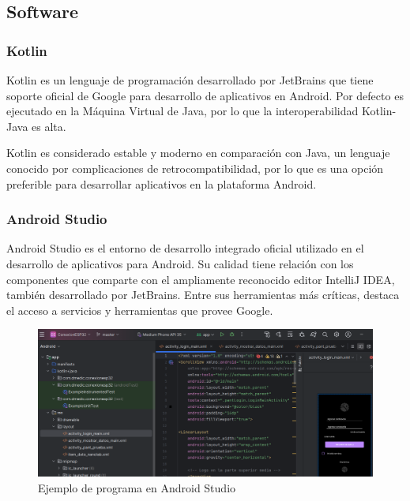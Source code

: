 \documentclass[../main]{subfiles}
\begin{document}
\subsection{Software}

\subsubsection{Kotlin}

Kotlin es un lenguaje de programación desarrollado por JetBrains que tiene
soporte oficial de Google para desarrollo de aplicativos en Android.
Por defecto es ejecutado en la Máquina Virtual de Java, por lo que la
interoperabilidad Kotlin-Java es alta. \supercite{JetBrains}

Kotlin es considerado estable y moderno en comparación con Java, un lenguaje
conocido por complicaciones de retrocompatibilidad, por lo que es una opción
preferible para desarrollar aplicativos en la plataforma Android.
\supercite{Moskala_Wojda_2017b}

\subsubsection{Android Studio}

Android Studio es el entorno de desarrollo integrado oficial utilizado en el
desarrollo de aplicativos para Android.
Su calidad tiene relación con los componentes que comparte con el ampliamente
reconocido editor IntelliJ IDEA, también desarrollado por JetBrains.
Entre sus herramientas más críticas, destaca el acceso a servicios y
herramientas que provee Google. \supercite{android_developers}

\begin{figure}[H]
	\centering
	\includegraphics[width=15cm]{res/EjemploDeProgramaAndroidStudio.png}
	\caption{Ejemplo de programa en Android Studio}
	\label{ImagenEjemploAndroidStudio}
\end{figure}
\end{document}
